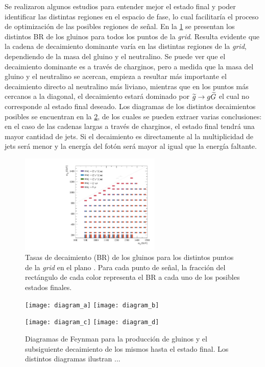 Se realizaron algunos estudios para entender mejor el estado final y poder
identificar las distintas regiones en el espacio de fase, lo cual facilitaría el
proceso de optimización de las posibles regiones de se\~nal. En la
\cref{fig:signal_br_gl} se presentan los distintos BR de los gluinos para todos
los puntos de la \emph{grid}. Resulta evidente que la cadena de decaimiento dominante
varía en las distintas regiones de la \emph{grid}, dependiendo de la masa del gluino y
el neutralino. Se puede ver que el decaimiento dominante es a través de
charginos, pero a medida que la masa del gluino y el neutralino se acercan,
empieza a resultar más importante el decaimiento directo al neutralino más
liviano, mientras que en los puntos más cercanos a la diagonal, el decaimiento
estará dominado por $\widetilde{g}\rightarrow g\widetilde{G}$ el cual no corresponde al estado
final deseado. Los diagramas de los distintos decaimientos posibles se encuentran
en la \cref{fig:signal_diagrams}, de los cuales se pueden extraer varias
conclusiones: en el caso de las cadenas largas a través de charginos, el estado
final tendrá una mayor cantidad de jets. Si el decaimiento es directamente al
{\ninoone} la multiplicidad de jets será menor y la energía del fotón será mayor
al igual que la energía faltante.


\begin{figure}[!htb]
  \centering

  \includegraphics[width=0.6\textwidth]{figures/br_gl_X}

  \caption{Tasas de decaimiento (BR) de los gluinos para los distintos puntos de la \emph{grid} en
    el plano \mgmn. Para cada punto de señal, la fracción del rectángulo de cada color representa
    el BR a cada uno de los posibles estados finales.}
  \label{fig:signal_br_gl}
\end{figure}


\begin{figure}[!htb]
  \centering

  \texttt{[image: diagram\_a]}
  \texttt{[image: diagram\_b]}

  \texttt{[image: diagram\_c]}
  \texttt{[image: diagram\_d]}

  \caption{Diagramas de Feynman para la producción de gluinos y el subsiguiente
    decaimiento de los mismos hasta el estado final. Los distintos diagramas ilustran ... }
  \label{fig:signal_diagrams}

\end{figure}


